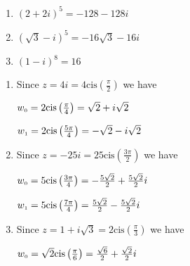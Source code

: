 \begin{multicols}{3}

\begin{enumerate}

\setcounter{enumi}{\value{HW}}

\item $(2+2i)^5 = -128-128i$
\item $(\sqrt{3} - i)^{5} =  -16\sqrt{3} - 16i$
\item  $(1-i)^8=16$

\setcounter{HW}{\value{enumi}}

\end{enumerate}

\end{multicols}

\begin{enumerate}

\setcounter{enumi}{\value{HW}}

\item Since $z=4i = 4\text{cis}\left(\frac{\pi}{2}\right)$ we have 

\begin{multicols}{2}

$w_{\text{\tiny$0$}} = 2\text{cis}\left(\frac{\pi}{4}\right) = \sqrt{2} +i\sqrt{2}$

$w_{\text{\tiny$1$}} = 2\text{cis}\left(\frac{5\pi}{4}\right) = -\sqrt{2} - i\sqrt{2}$

\end{multicols}

\item Since $z=-25i = 25\text{cis}\left(\frac{3\pi}{2}\right)$ we have 

\begin{multicols}{2}

$w_{\text{\tiny$0$}} = 5\text{cis}\left(\frac{3\pi}{4}\right) = -\frac{5\sqrt{2}}{2} +\frac{5\sqrt{2}}{2} i$

$w_{\text{\tiny$1$}} = 5\text{cis}\left(\frac{7\pi}{4}\right) = \frac{5\sqrt{2}}{2} - \frac{5\sqrt{2}}{2} i$

\end{multicols}

\item Since $z=1 + i\sqrt{3} = 2\text{cis}\left(\frac{\pi}{3}\right)$ we have 

\begin{multicols}{2}

$w_{\text{\tiny$0$}} = \sqrt{2}\text{cis}\left(\frac{\pi}{6}\right) = \frac{\sqrt{6}}{2} +\frac{\sqrt{2}}{2} i$


\end{multicols}
\end{enumerate}
